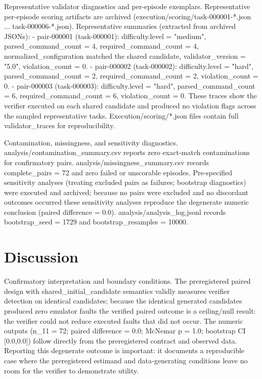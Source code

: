 \documentclass[conference]{IEEEtran}
\begin{document}
Representative validator diagnostics and per-episode exemplars. Representative per-episode scoring artifacts are archived (execution/scoring/task-000001-*.json ... task-000006-*.json). Representative summaries (extracted from archived JSONs):
- pair-000001 (task-000001): difficulty.level = "medium", parsed\_command\_count = 4, required\_command\_count = 4, normalized\_configuration matched the shared candidate, validator\_version = "5.0", violation\_count = 0.
- pair-000002 (task-000002): difficulty.level = "hard", parsed\_command\_count = 2, required\_command\_count = 2, violation\_count = 0.
- pair-000003 (task-000003): difficulty.level = "hard", parsed\_command\_count = 6, required\_command\_count = 6, violation\_count = 0.
These traces show the verifier executed on each shared candidate and produced no violation flags across the sampled representative tasks. Execution/scoring/*.json files contain full validator\_traces for reproducibility.

Contamination, missingness, and sensitivity diagnostics. analysis/contamination\_summary.csv reports zero exact-match contaminations for confirmatory pairs. analysis/missingness\_summary.csv records complete\_pairs = 72 and zero failed or unscorable episodes. Pre-specified sensitivity analyses (treating excluded pairs as failures; bootstrap diagnostics) were executed and archived; because no pairs were excluded and no discordant outcomes occurred these sensitivity analyses reproduce the degenerate numeric conclusion (paired difference = 0.0). analysis/analysis\_log.jsonl records bootstrap\_seed = 1729 and bootstrap\_resamples = 10000.

\section{Discussion}
Confirmatory interpretation and boundary conditions. The preregistered paired design with shared\_initial\_candidate semantics validly measures verifier detection on identical candidates; because the identical generated candidates produced zero emulator faults the verified paired outcome is a ceiling/null result: the verifier could not reduce executed faults that did not occur. The numeric outputs (n\_11 = 72; paired difference = 0.0; McNemar p = 1.0; bootstrap CI [0.0,0.0]) follow directly from the preregistered contract and observed data. Reporting this degenerate outcome is important: it documents a reproducible case where the preregistered estimand and data-generating conditions leave no room for the verifier to demonstrate utility.
\end{document}
